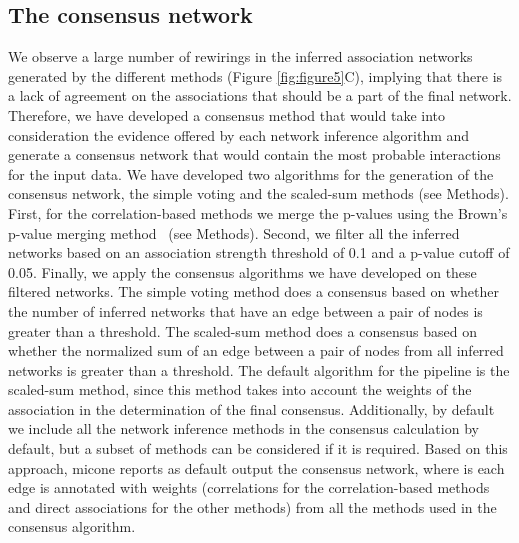 
  \FloatBarrier

  \subsection*{The consensus network}

  We observe a large number of rewirings in the inferred association networks generated by the different methods (Figure \ref{fig:figure5}C), implying that there is a lack of agreement on the associations that should be a part of the final network.
  Therefore, we have developed a consensus method that would take into consideration the evidence offered by each network inference algorithm and generate a consensus network that would contain the most probable interactions for the input data.
  We have developed two algorithms for the generation of the consensus network, the simple voting and the scaled-sum methods (see Methods).
  First, for the correlation-based methods we merge the p-values using the Brown's p-value merging method~\cite{Poole_Gibbs_Shmulevich_Bernard_Knijnenburg_2016,faustCoNetAppInference2016} (see Methods).
  Second, we filter all the inferred networks based on an association strength threshold of 0.1 and a p-value cutoff of 0.05.
  Finally, we apply the consensus algorithms we have developed on these filtered networks.
  The simple voting method does a consensus based on whether the number of inferred networks that have an edge between a pair of nodes is greater than a threshold.
  The scaled-sum method does a consensus based on whether the normalized sum of an edge between a pair of nodes from all inferred networks is greater than a threshold.
  The default algorithm for the pipeline is the scaled-sum method, since this method takes into account the weights of the association in the determination of the final consensus.
  Additionally, by default we include all the network inference methods in the consensus calculation by default, but a subset of methods can be considered if it is required.
  Based on this approach, \ac{micone} reports as default output the consensus network, where is each edge is annotated with weights (correlations for the correlation-based methods and direct associations for the other methods) from all the methods used in the consensus algorithm.

